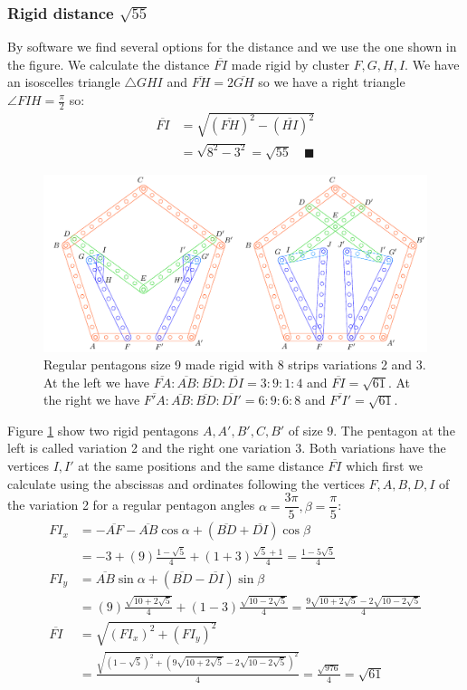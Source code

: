 \documentclass[11pt]{article}
\begin{document}
\subsubsection{Rigid distance $\sqrt{55}$}

By software we find several options for the distance and we use the one shown in the figure.
We calculate the distance $\overline{FI}$ made rigid by cluster $F,G,H,I$. We have an isoscelles triangle $\triangle{GHI}$ and $\overline{FH}=2\overline{GH}$ so we have a right triangle $\angle{FIH}=\frac{\pi}2$ so: \begin{align}
\overline{FI} &= \sqrt{(\overline{FH})^2 - (\overline{HI})^2}\nonumber\\
 &= \sqrt{8^2 - 3^2} = \sqrt{55} \quad\blacksquare
\end{align}

\begin{figure}[H]
 \centering
 \includegraphics[scale=0.95]{9/penta9-8b}
 \caption{Regular pentagons size 9 made rigid with 8 strips variations 2 and 3. At the left we have $\overline{FA}:\overline{AB}:\overline{BD}:\overline{DI} = 3:9:1:4$ and $\overline{FI} = \sqrt{61}$. At the right we have $\overline{F'A}:\overline{AB}:\overline{BD}:\overline{DI'} = 6:9:6:8$ and $\overline{F'I'}=\sqrt{61}$.}
 \label{fig:penta9-8b}
\end{figure}

Figure \ref{fig:penta9-8b} show two rigid pentagons $A,A',B',C,B'$ of size $9$. The pentagon at the left is called variation 2 and the right one variation 3. Both variations have the vertices $I,I'$ at the same positions and the same distance $\overline{FI}$ which first we calculate using the abscissas and ordinates following the vertices $F,A,B,D,I$ of the variation 2 for a regular pentagon angles $\alpha=\dfrac{3\pi}5, \beta=\dfrac{\pi}5$:
\begin{align}
FI_x &= -\overline{AF} - \overline{AB}\cos\alpha + (\overline{BD} + \overline{DI})\cos\beta\nonumber\\
 &= -3 + (9)\frac{1-\sqrt5}4 + (1+3)\frac{\sqrt5+1}4 = \frac{1-5\sqrt5}4\\
FI_y &= \overline{AB}\sin\alpha + (\overline{BD}-\overline{DI})\sin\beta\nonumber\\
 &= (9)\frac{\sqrt{10+2\sqrt5}}4 + (1-3)\frac{\sqrt{10-2\sqrt5}}4
 = \frac{9\sqrt{10+2\sqrt5} - 2\sqrt{10-2\sqrt5}}4\\
\overline{FI} &= \sqrt{(FI_x)^2 + (FI_y)^2}\nonumber\\
 &= \frac{\sqrt{(1-\sqrt5)^2 + (9\sqrt{10+2\sqrt5} - 2\sqrt{10-2\sqrt5})^2}}4
 = \frac{\sqrt{976}}4 = \sqrt{61}
\end{align}
\end{document}
